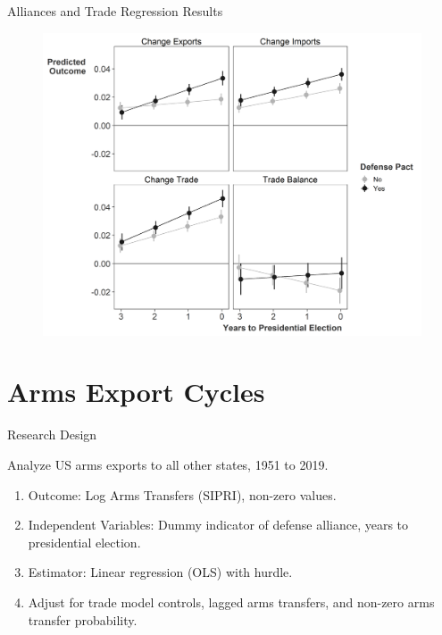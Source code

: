 \documentclass[12pt]{beamer}
\begin{document}
\begin{frame}{Alliances and Trade Regression Results}

\begin{figure}[htbp]
	\centering
		\includegraphics[height=.9\textheight]{us-elec-pred.png}
\end{figure}

\end{frame} 




\section{Arms Export Cycles} 


\begin{frame}{Research Design}

\pause
Analyze US arms exports to all other states, 1951 to 2019. 
\pause
\begin{enumerate}
\item Outcome: Log Arms Transfers (SIPRI), non-zero values. 
\pause
\item Independent Variables: Dummy indicator of defense alliance, years to presidential election.
\pause 
\item Estimator: Linear regression (OLS) with hurdle. 
\pause 
\item Adjust for trade model controls, lagged arms transfers, and non-zero arms transfer probability.
\end{enumerate} 

\end{frame} 
\end{document}
